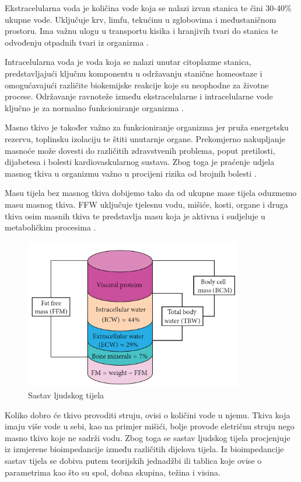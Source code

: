 \documentclass[../diplomski_rad.tex]{subfiles}
\begin{document}
Ekstracelularna voda je količina vode koja se nalazi izvan stanica te čini 30-40\% ukupne vode. Uključuje krv, limfu, tekućinu u 
zglobovima i međustaničnom prostoru. Ima važnu ulogu u transportu kisika i hranjivih tvari do stanica te odvođenju otpadnih 
tvari iz organizma \cite{Bera2014}.

Intracelularna voda je voda koja se nalazi unutar citoplazme stanica, predstavljajući ključnu 
komponentu u održavanju stanične homeostaze i omogućavajući različite biokemijske reakcije 
koje su neophodne za životne procese.
Održavanje ravnoteže između ekstracelularne i intracelularne vode ključno je za normalno funkcioniranje organizma \cite{Bera2014}.

Masno tkivo je također važno za funkcioniranje organizma jer pruža energetsku rezervu, toplinsku izolaciju te štiti unutarnje organe. 
Prekomjerno nakupljanje masnoće može dovesti do različitih zdravstvenih problema, poput pretilosti, dijabetesa i 
bolesti kardiovaskularnog sustava. 
Zbog toga je praćenje udjela masnog tkiva u organizmu važno u procijeni rizika od brojnih bolesti \cite{Bera2014}.

Masu tijela bez masnog tkiva dobijemo tako da od ukupne mase tijela oduzmemo masu masnog tkiva. 
FFW uključuje tjelesnu vodu, mišiće, kosti, organe i druga tkiva osim masnih tkiva te predstavlja masu koja je aktivna i sudjeluje 
u metaboličkim procesima \cite{Bera2014}.

\begin{figure}[htb]
    \centering
    \includegraphics[width=0.85\textwidth]{Figures/sastav_tijela.png} 
    \caption{Sastav ljudskog tijela \cite{Bera2014}}
    \label{slk:sastav_tijela}
\end{figure}

Koliko dobro će tkivo provoditi struju, ovisi o količini vode u njemu. 
Tkiva koja imaju više vode u sebi, kao na primjer mišići, bolje provode eletričnu struju nego masno tkivo koje ne sadrži vodu. 
Zbog toga se sastav ljudskog tijela procjenjuje iz izmjerene bioimpedancije između različitih dijelova tijela. 
Iz bioimpedancije sastav tijela se dobiva putem teorijskih jednadžbi ili tablica koje ovise o parametrima 
kao što su spol, dobna skupina, težina i visina.
\end{document}
